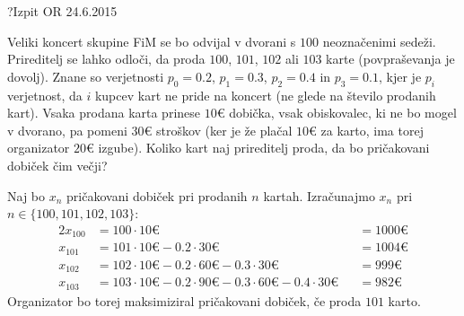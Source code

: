\begin{naloga}{?}{Izpit OR 24.6.2015}
\begin{vprasanje}
Veliki koncert skupine FiM
se bo odvijal v dvorani s $100$ neoznačenimi sedeži.
Prireditelj se lahko odloči, da proda $100$, $101$, $102$ ali $103$ karte
(povpraševanja je dovolj).
Znane so verjetnosti $p_0 = 0.2$, $p_1 = 0.3$, $p_2 = 0.4$ in $p_3 = 0.1$,
kjer je $p_i$ verjetnost, da $i$ kupcev kart ne pride na koncert
(ne glede na število prodanih kart).
Vsaka prodana karta prinese $10 €$ dobička,
vsak obiskovalec, ki ne bo mogel v dvorano, pa pomeni $30 €$ stroškov
(ker je že plačal $10 €$ za karto, ima torej organizator $20 €$ izgube).
Koliko kart naj prireditelj proda, da bo pričakovani dobiček čim večji?
\end{vprasanje}

\begin{odgovor}
Naj bo $x_n$ pričakovani dobiček pri prodanih $n$ kartah.
Izračunajmo $x_n$ pri $n \in \{100, 101, 102, 103\}$:
\begin{alignat*}{2}
x_{100} &= 100 \cdot 10 € &&= 1000 € \\
x_{101} &= 101 \cdot 10 € - 0.2 \cdot 30 € &&= 1004 € \\
x_{102} &= 102 \cdot 10 € - 0.2 \cdot 60 € - 0.3 \cdot 30 € &&= 999 € \\
x_{103} &= 103 \cdot 10 € - 0.2 \cdot 90 € - 0.3 \cdot 60 € - 0.4 \cdot 30 €
&&= 982 €
\end{alignat*}
Organizator bo torej maksimiziral pričakovani dobiček,
če proda $101$ karto.
\end{odgovor}
\end{naloga}

